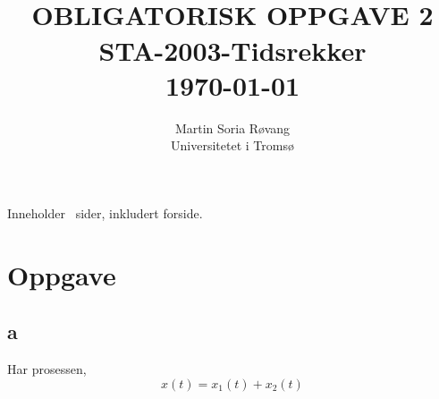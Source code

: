 
\usepackage{amssymb}
\usepackage{gensymb}
\usepackage{amsmath}
\usepackage[section]{placeins}


{\selectfont
\title{ \normalsize \textsc{}
		\\ [1.0cm] %
        \LARGE \textbf{\uppercase{Obligatorisk Oppgave 2}
        \HRule{0.5pt} \\ [0.5cm]
        STA-2003-Tidsrekker
        \\
		\normalsize \today \vspace*{5\baselineskip}}
		}

        \date{}
\author{
		Martin Soria Røvang \\ 
        Universitetet i Tromsø\\}

\clearpage\maketitle
\vspace{0.2\textheight}
{\centering
Inneholder \pageref{LastPage} \, sider, inkludert forside.\par
}
\thispagestyle{empty}

\newpage
\tableofcontents

\newpage

\section{Oppgave}
\subsection{a}

Har prosessen,
\begin{equation}
    x(t) = x_{1}(t) + x_{2}(t)
    \label{starteq}
\end{equation}

}
